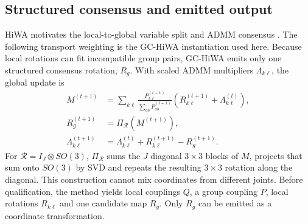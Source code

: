 \documentclass[10pt,a4paper]{article}
\begin{document}
\subsection{Structured consensus and emitted output}
HiWA motivates the local-to-global variable split and ADMM consensus \cite{lee2019hierarchical}. The following transport weighting is the GC-HiWA instantiation used here. Because local rotations can fit incompatible group pairs, GC-HiWA emits only one structured consensus rotation, $R_g$. With scaled ADMM multipliers $\Lambda_{k\ell}$, the global update is
\begin{align}
M^{(t+1)}&=\sum_{k\ell}\frac{P_{k\ell}^{(t+1)}}{\sum_{ab}P_{ab}^{(t+1)}}(R_{k\ell}^{(t+1)}+\Lambda_{k\ell}^{(t)}),\\
R_g^{(t+1)}&=\Pi_{\mathcal R}(M^{(t+1)}),\\
\Lambda_{k\ell}^{(t+1)}&=\Lambda_{k\ell}^{(t)}+R_{k\ell}^{(t+1)}-R_g^{(t+1)}.
\label{eq:en-admm}
\end{align}
For $\mathcal R=I_J\otimes SO(3)$, $\Pi_{\mathcal R}$ sums the $J$ diagonal $3\times3$ blocks of $M$, projects that sum onto $SO(3)$ by SVD and repeats the resulting $3\times3$ rotation along the diagonal. This construction cannot mix coordinates from different joints. Before qualification, the method yields local couplings $Q$, a group coupling $P$, local rotations $R_{k\ell}$ and one candidate map $R_g$. Only $R_g$ can be emitted as a coordinate transformation.
\end{document}
